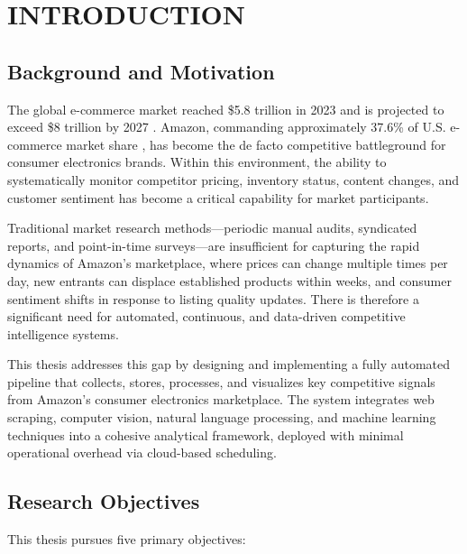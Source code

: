 \chapter{INTRODUCTION}

\section{Background and Motivation}

The global e-commerce market reached \$5.8 trillion in 2023 and is projected to exceed
\$8 trillion by 2027 \cite{statista2024ecommerce}. Amazon, commanding approximately
37.6\% of U.S. e-commerce market share \cite{emarketer2024}, has become the de facto
competitive battleground for consumer electronics brands. Within this environment, the
ability to systematically monitor competitor pricing, inventory status, content changes,
and customer sentiment has become a critical capability for market participants.

Traditional market research methods—periodic manual audits, syndicated reports, and
point-in-time surveys—are insufficient for capturing the rapid dynamics of Amazon's
marketplace, where prices can change multiple times per day, new entrants can displace
established products within weeks, and consumer sentiment shifts in response to listing
quality updates. There is therefore a significant need for automated, continuous, and
data-driven competitive intelligence systems.

This thesis addresses this gap by designing and implementing a fully automated pipeline
that collects, stores, processes, and visualizes key competitive signals from Amazon's
consumer electronics marketplace. The system integrates web scraping, computer vision,
natural language processing, and machine learning techniques into a cohesive analytical
framework, deployed with minimal operational overhead via cloud-based scheduling.

\section{Research Objectives}

This thesis pursues five primary objectives:

